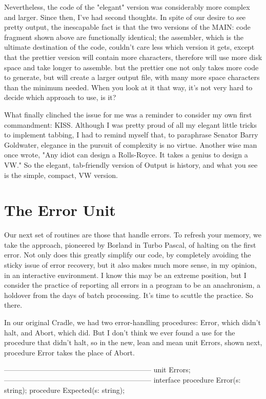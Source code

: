 \documentclass[float=false, crop=false]{standalone}
\begin{document}
Nevertheless, the code of the "elegant" version was considerably more complex
and larger. Since then, I've had second thoughts. In spite of our desire to see
pretty output, the inescapable fact is that the two versions of the MAIN: code
fragment shown above are functionally identical; the assembler, which is the
ultimate destination of the code, couldn't care less which version it gets,
except that the prettier version will contain more characters, therefore will
use more disk space and take longer to assemble. but the prettier one not only
takes more code to generate, but will create a larger output file, with many
more space characters than the minimum needed. When you look at it that way,
it's not very hard to decide which approach to use, is it?

What finally clinched the issue for me was a reminder to consider my own first
commandment: KISS. Although I was pretty proud of all my elegant little tricks
to implement tabbing, I had to remind myself that, to paraphrase Senator Barry
Goldwater, elegance in the pursuit of complexity is no virtue. Another wise man
once wrote, "Any idiot can design a Rolls-Royce. It takes a genius to design a
VW." So the elegant, tab-friendly version of Output is history, and what you see
is the simple, compact, VW version.


\section{The Error Unit}

Our next set of routines are those that handle errors. To refresh your memory,
we take the approach, pioneered by Borland in Turbo Pascal, of halting on the
first error. Not only does this greatly simplify our code, by completely
avoiding the sticky issue of error recovery, but it also makes much more sense,
in my opinion, in an interactive environment. I know this may be an extreme
position, but I consider the practice of reporting all errors in a program to be
an anachronism, a holdover from the days of batch processing. It's time to
scuttle the practice. So there.

In our original Cradle, we had two error-handling procedures: Error, which
didn't halt, and Abort, which did. But I don't think we ever found a use for the
procedure that didn't halt, so in the new, lean and mean unit Errors, shown
next, procedure Error takes the place of Abort.


{--------------------------------------------------------------}
unit Errors;
{--------------------------------------------------------------}
interface
procedure Error(s: string);
procedure Expected(s: string);
\end{document}
